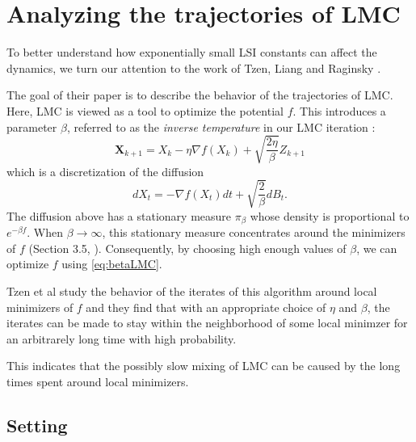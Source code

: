 \documentclass[10pt,journal,a4paper]{IEEEtran}
\theoremstyle{definition}
\begin{document}
\section{Analyzing the trajectories of LMC}

To better understand how exponentially small LSI constants can affect the dynamics, we turn our attention to the work of Tzen, Liang and Raginsky \cite{tzen_local_2018}. 

The goal of their paper is to describe the behavior of the trajectories of LMC. Here, LMC is viewed as a tool to optimize the potential $f$. This introduces a parameter $\beta$, referred to as the \textit{inverse temperature} in our LMC iteration :
\begin{equation}
\label{eq:betaLMC}
\mathbf{X}_{k+1} = X_k - \eta \nabla f(X_k) + \sqrt{\frac{2\eta}{\beta}}Z_{k+1}
\tag{LMC-$\beta$}
\end{equation}
which is a discretization of the diffusion
\begin{equation}
\label{eq:betadiff}
\tag{LD-$\beta$}
dX_t = -\nabla f(X_t)dt + \sqrt{\frac{2}{\beta}}dB_t.
\end{equation}
The diffusion above has a stationary measure $\pi_\beta$ whose density is proportional to $e^{-\beta f}$. When $\beta \rightarrow \infty$, this stationary measure concentrates around the minimizers of $f$ (Section 3.5, \cite{raginsky_non-convex_2017}). Consequently, by choosing high enough values of $\beta$, we can optimize $f$ using \eqref{eq:betaLMC}.

Tzen et al study the behavior of the iterates of this algorithm around local minimizers of $f$ and they find that with an appropriate choice of $\eta$ and $\beta$, the iterates can be made to stay within the neighborhood of some local minimzer for an arbitrarely long time with high probability.

This indicates that the possibly slow mixing of LMC can be caused by the long times spent around local minimizers.


\subsection{Setting}
\end{document}

